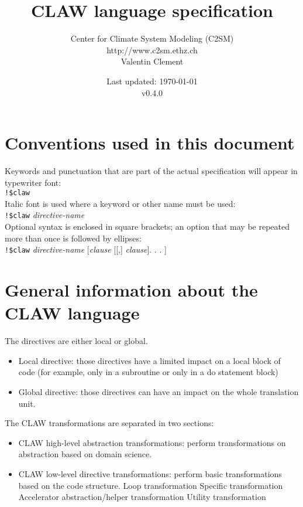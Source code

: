 \documentclass{article}
\title{CLAW language specification}
\author{Center for Climate System Modeling (C2SM)\\http://www.c2sm.ethz.ch\\Valentin Clement}
\date{Last updated: \today \\\vspace{1em}v0.4.0}
\begin{document}
\maketitle


\tableofcontents

\section*{Conventions used in this document}

Keywords and punctuation that are part of the actual specification will appear
in typewriter font: \\

\lstinline|!$claw|\\

Italic font is used where a keyword or other name must be used: \\

\lstinline|!$claw| \textit{directive-name}\\

Optional syntax is enclosed in square brackets; an option that may be repeated
more than once is followed by ellipses:\\

\lstinline|!$claw| \textit{directive-name} [\textit{clause}
[[,] \textit{clause}]. . . ]

\section{General information about the CLAW language}
The directives are either local or global.

\begin{itemize}
\item Local directive: those directives have a limited impact on a local block
of code (for example, only in a subroutine or only in a do statement block)
\item Global directive: those directives can have an impact on the whole
translation unit.
\end{itemize}

The CLAW transformations are separated in two sections:
\begin{itemize}
\item CLAW high-level abstraction transformations: perform transformations
on abstraction based on domain science.
\item CLAW low-level directive transformations: perform basic transformations
based on the code structure.
\subitem Loop transformation
\subitem Specific transformation
\subitem Accelerator abstraction/helper transformation
\subitem Utility transformation
\end{itemize}
\end{document}

